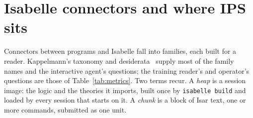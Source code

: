 \documentclass[11pt]{article}
\newcommand{\code}[1]{\colorbox{gray!12}{\texttt{\vphantom{Ag}#1}}}
\begin{document}
\section{Isabelle connectors and where IPS sits}
\label{sec:position}

Connectors between programs and Isabelle fall into families, each built
for a reader. Kappelmann's taxonomy and
desiderata~\cite{kappelmann2026pidemcp} supply most of the family names
and the interactive agent's questions; the training reader's and
operator's questions are those of Table~\ref{tab:metrics}. Two terms
recur. A \emph{heap} is a session image: the logic and the theories it
imports, built once by \code{isabelle build} and loaded by every session
that starts on it. A \emph{chunk} is a block of Isar text, one or more
commands, submitted as one unit.
\end{document}
